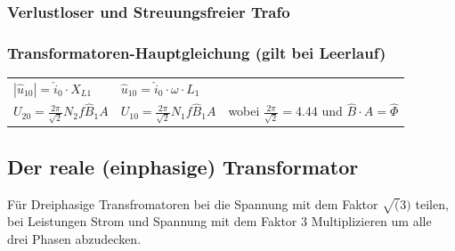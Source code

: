 		\subsubsection{Verlustloser und Streuungsfreier Trafo}
			 	
		\subsubsection{Transformatoren-Hauptgleichung (gilt bei Leerlauf)}
			\begin{tabular}{p{7cm}p{4.5cm}p{5cm}}
      			$| \hat{u}_{10} | = \hat{i}_0 \cdot X_{L1}$
      			& 	$\hat{u}_{10} = \hat{i}_0 \cdot \omega \cdot L_1$ \\
      		
				$U_{20} = \frac{2\pi}{\sqrt{2}}N_2 f \hat{B}_1 A$
				&
            	$U_{10} = \frac{2\pi}{\sqrt{2}}N_1 f \hat{B}_1 A$ &
					wobei $\frac{2\pi}{\sqrt{2}} = 4.44$ und $\hat{B} \cdot A = \hat{\Phi}$ 
			\end{tabular}
	\subsection{Der reale (einphasige) Transformator}
	Für Dreiphasige Transfromatoren bei die Spannung mit dem Faktor $\sqrt(3)$
	teilen, bei Leistungen  Strom und Spannung mit dem Faktor $3$
	Multiplizieren um alle drei Phasen abzudecken.\\

